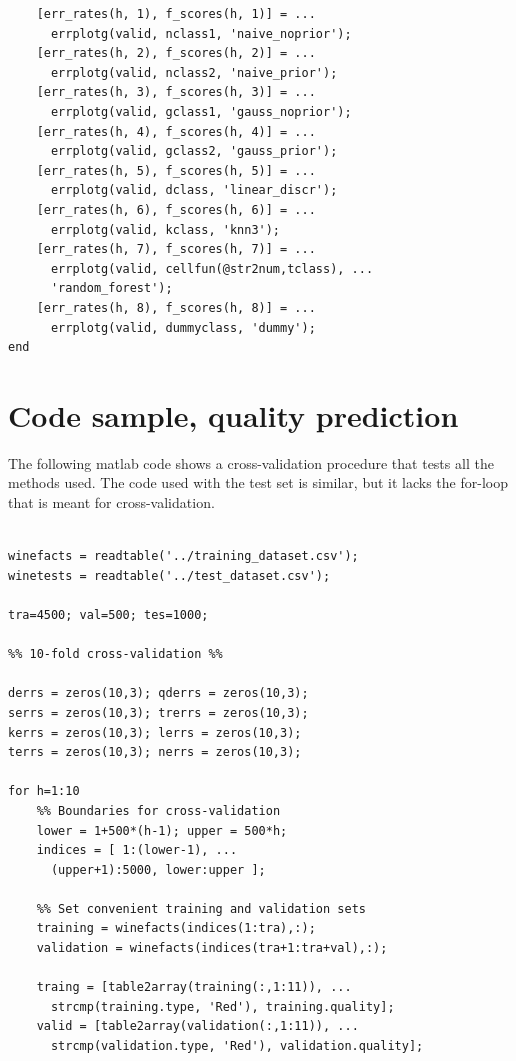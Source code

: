 \documentclass[twoside]{article}
\begin{document}
\begin{multicols}{2}
{\begin{verbatim}
    [err_rates(h, 1), f_scores(h, 1)] = ... 
      errplotg(valid, nclass1, 'naive_noprior');
    [err_rates(h, 2), f_scores(h, 2)] = ...
      errplotg(valid, nclass2, 'naive_prior');
    [err_rates(h, 3), f_scores(h, 3)] = ...
      errplotg(valid, gclass1, 'gauss_noprior');
    [err_rates(h, 4), f_scores(h, 4)] = ...
      errplotg(valid, gclass2, 'gauss_prior');
    [err_rates(h, 5), f_scores(h, 5)] = ...
      errplotg(valid, dclass, 'linear_discr');
    [err_rates(h, 6), f_scores(h, 6)] = ...
      errplotg(valid, kclass, 'knn3');
    [err_rates(h, 7), f_scores(h, 7)] = ...
      errplotg(valid, cellfun(@str2num,tclass), ...
      'random_forest');
    [err_rates(h, 8), f_scores(h, 8)] = ...
      errplotg(valid, dummyclass, 'dummy');
end

\end{verbatim}

}

\section{Code sample, quality prediction}\label{appendix:qualitycode}

The following matlab code shows a cross-validation procedure
that tests all the methods used. The code used with the test
set is similar, but it lacks the for-loop that is meant for 
cross-validation.

{\footnotesize

\begin{verbatim}

winefacts = readtable('../training_dataset.csv');
winetests = readtable('../test_dataset.csv');

tra=4500; val=500; tes=1000;

%% 10-fold cross-validation %%

derrs = zeros(10,3); qderrs = zeros(10,3); 
serrs = zeros(10,3); trerrs = zeros(10,3); 
kerrs = zeros(10,3); lerrs = zeros(10,3); 
terrs = zeros(10,3); nerrs = zeros(10,3);

for h=1:10
    %% Boundaries for cross-validation
    lower = 1+500*(h-1); upper = 500*h;
    indices = [ 1:(lower-1), ... 
      (upper+1):5000, lower:upper ];

    %% Set convenient training and validation sets
    training = winefacts(indices(1:tra),:);
    validation = winefacts(indices(tra+1:tra+val),:);

    traing = [table2array(training(:,1:11)), ... 
      strcmp(training.type, 'Red'), training.quality];
    valid = [table2array(validation(:,1:11)), ...
      strcmp(validation.type, 'Red'), validation.quality];


\end{verbatim}}
\end{multicols}
\end{document}
